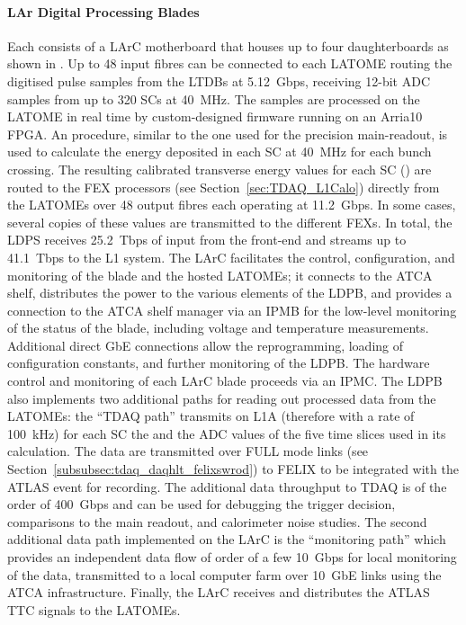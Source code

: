 \documentclass[cernpreprint, atlasdraft=false, UKenglish,british,orcidlogo, texmf, orcidlogo]{atlasdoc}
\begin{document}
\paragraph{LAr Digital Processing Blades} Each  consists of a \gls{LArC} motherboard that houses up to four   daughterboards as shown in
\Fig{\ref{fig:larLDPB}}. Up to 48 input fibres can be connected to each \gls{LATOME} routing the
digitised pulse samples from the \glspl{LTDB} at \SI{5.12}{Gbps}, receiving 12-bit \gls{ADC} samples
from up to 320 \glspl{SC} at \SI{40}{MHz}. The samples are processed on the \gls{LATOME} in real time by
custom-designed firmware running on an Arria10 \gls{FPGA}. An  procedure,
similar to the one used for the precision main-readout, is used to
calculate the energy deposited in each \gls{SC} at \SI{40}{MHz} for each bunch crossing.
The resulting calibrated transverse energy values for each \gls{SC} (\etsc) are routed to the
\gls{FEX} processors (see Section~\ref{sec:TDAQ_L1Calo}) directly from the \glspl{LATOME} over 48 output fibres
each operating at \SI{11.2}{Gbps}. In some cases, several copies of these values are transmitted to the different \glspl{FEX}.
In total, the \gls{LDPS} receives \SI{25.2}{Tbps} of input from the front-end and
streams up to \SI{41.1}{Tbps} to the \gls{L1} system.  The \gls{LArC} facilitates the control,
configuration, and monitoring of the blade and the hosted \glspl{LATOME}; it connects to
the \gls{ATCA} shelf, distributes the power to the various elements of the \gls{LDPB}, and
provides a connection to the \gls{ATCA} shelf manager via an \gls{IPMB}
for the low-level monitoring of the status of the blade, including voltage and temperature measurements.
Additional direct \gls{GbE} connections allow the reprogramming, loading of configuration constants, and
further monitoring of the \gls{LDPB}. The hardware control and monitoring of each \gls{LArC} blade proceeds via an \gls{IPMC}.
The \gls{LDPB} also implements two additional paths for reading out
processed data from the \glspl{LATOME}: the ``\gls{TDAQ} path'' transmits
on \gls{L1A} (therefore with a rate of \SI{100}{kHz}) for each \gls{SC} the \etsc and the \gls{ADC} values of the five
time slices used in its calculation. The data are transmitted over FULL mode links
(see Section~\ref{subsubsec:tdaq_daqhlt_felixswrod}) to
\gls{FELIX} to be integrated with the ATLAS event for recording.
The additional data throughput to \gls{TDAQ} is of the order of \SI{400}{Gbps} and can be used
for debugging the trigger decision, comparisons to the main readout, and calorimeter noise studies.
The second additional data path implemented on the \gls{LArC} is the  ``monitoring path'' which provides
an independent data flow of order of a few \SI{10}{Gbps} for local monitoring of the data, transmitted to a local computer farm over 10~\gls{GbE} links
using the \gls{ATCA} infrastructure.
Finally, the \gls{LArC} receives and distributes the ATLAS \gls{TTC} signals
to the \glspl{LATOME}.
 
\end{document}
